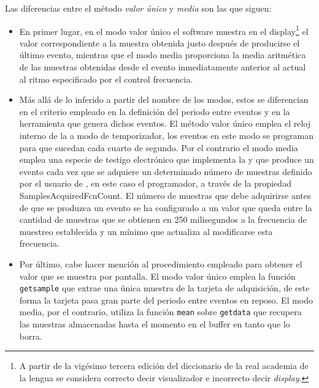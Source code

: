 Las diferencias entre el método \emph{valor único} y \emph{media} son las
que siguen:

\begin{itemize}
	\item En primer lugar, en el modo valor único el software muestra
		en el display\footnote{A partir de la vigésimo tercera
		edición del diccionario de la real academia de la lengua se
		considera correcto decir visualizador e incorrecto decir
		\emph{display}.} el valor correspondiente a la muestra
		obtenida justo después de producirse el último evento,
		mientras que el modo media proporciona la media aritmética
		de las muestras obtenidas desde el evento inmediatamente
		anterior al actual al ritmo especificado por el control
		\textsf{frecuencia}.
	\item Más allá de lo inferido a partir del nombre de los modos,
		estos se diferencian en el criterio empleado en la
		definición del periodo entre eventos y en la herramienta
		que genera dichos eventos. El método valor único emplea el
		reloj interno de la \kpci{} a modo de temporizador, los
		eventos en este modo se programan para que sucedan cada
		cuarto de segundo. Por el contrario el modo media emplea
		una especie de testigo electrónico que implementa la
		\datx{} y que produce un evento cada vez que se adquiere un
		determinado número de muestras definido por el usuario de
		\matlab{}, en este caso el programador, a través de la
		propiedad \textsf{SamplesAcquiredFcnCount}. El número de
		muestras que debe adquirirse antes de que se produzca un
		evento se ha configurado a un valor que queda entre la
		cantidad de muestras que se obtienen en 250 milisegundos a
		la frecuencia de muestreo establecida y un mínimo que
		\matlab{} actualiza al modificarse esta frecuencia.
	\item Por último, cabe hacer mención al procedimiento empleado para
		obtener el valor que se muestra por pantalla. El modo valor
		único emplea la función \texttt{getsample} que extrae una
		única muestra de la tarjeta de adquisición, de este forma
		la tarjeta pasa gran parte del periodo entre eventos en
		reposo. El modo media, por el contrario, utiliza la función
		\texttt{mean} sobre \texttt{getdata} que recupera las
		muestras almacenadas hasta el momento en el buffer en tanto
		que lo borra.
\end{itemize}


